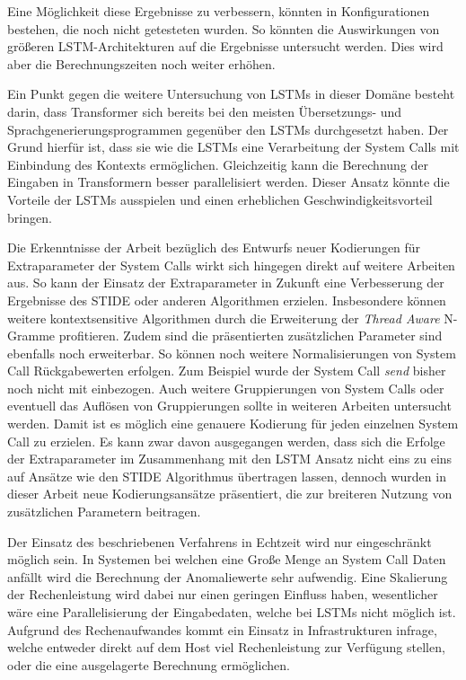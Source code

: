 Eine Möglichkeit diese Ergebnisse zu verbessern, könnten in Konfigurationen bestehen, die noch nicht getesteten wurden.
So könnten die Auswirkungen von größeren \ac{LSTM}-Architekturen auf die Ergebnisse untersucht werden.
Dies wird aber die Berechnungszeiten noch weiter erhöhen.\par\medskip

Ein Punkt gegen die weitere Untersuchung von \acp{LSTM} in dieser Domäne besteht darin, dass Transformer sich bereits bei den meisten Übersetzungs-  und Sprachgenerierungsprogrammen  gegenüber den \acp{LSTM} durchgesetzt haben. 
Der Grund hierfür ist, dass sie wie die \acp{LSTM} eine Verarbeitung der System Calls mit Einbindung des Kontexts ermöglichen.
Gleichzeitig kann die Berechnung der Eingaben in Transformern besser parallelisiert werden.
Dieser Ansatz könnte die Vorteile der \acp{LSTM} ausspielen und einen erheblichen Geschwindigkeitsvorteil bringen.\par\medskip

Die Erkenntnisse der Arbeit bezüglich des Entwurfs neuer Kodierungen für Extraparameter der System Calls wirkt sich hingegen direkt auf weitere Arbeiten aus.
So kann der Einsatz der Extraparameter in Zukunft eine Verbesserung der Ergebnisse des \ac{STIDE} oder anderen Algorithmen erzielen.
Insbesondere können weitere kontextsensitive Algorithmen durch die Erweiterung der \textit{Thread Aware} N-Gramme profitieren. 
Zudem sind die präsentierten zusätzlichen Parameter sind ebenfalls noch erweiterbar.
So können noch weitere Normalisierungen von System Call Rückgabewerten erfolgen.
Zum Beispiel wurde der System Call \textit{send} bisher noch nicht mit einbezogen.
Auch weitere Gruppierungen von System Calls oder eventuell das Auflösen von Gruppierungen sollte in weiteren Arbeiten untersucht werden.
Damit ist es möglich eine genauere Kodierung für jeden einzelnen System Call zu erzielen.
Es kann zwar davon ausgegangen werden, dass sich die Erfolge der Extraparameter im Zusammenhang mit den \ac{LSTM} Ansatz nicht eins zu eins auf Ansätze wie den \ac{STIDE} Algorithmus übertragen lassen, dennoch wurden in dieser Arbeit neue Kodierungsansätze präsentiert, die zur breiteren Nutzung von zusätzlichen Parametern beitragen.
\par\medskip

Der Einsatz des beschriebenen Verfahrens in Echtzeit wird nur eingeschränkt möglich sein.
In Systemen bei welchen eine Große Menge an System Call Daten anfällt wird die Berechnung der Anomaliewerte sehr aufwendig.
Eine Skalierung der Rechenleistung wird dabei nur einen geringen Einfluss haben, wesentlicher wäre eine Parallelisierung der Eingabedaten, welche bei \acp{LSTM} nicht möglich ist.
Aufgrund des Rechenaufwandes kommt ein Einsatz in Infrastrukturen infrage, welche entweder direkt auf dem Host viel Rechenleistung zur Verfügung stellen, oder die eine ausgelagerte Berechnung ermöglichen.

